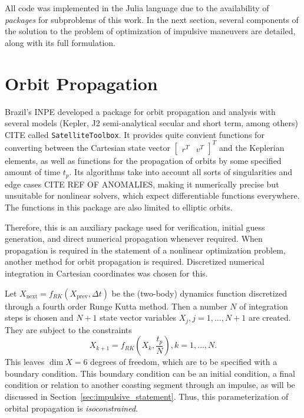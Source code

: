 
All code was implemented in the Julia language due to the availability of \textit{packages} for subproblems of this work. In the next section, several components of the solution to the problem of optimization of impulsive maneuvers are detailed, along with its full formulation.

\section{Orbit Propagation}

Brazil's INPE developed a package for orbit propagation and analysis with several models (Kepler, J2 semi-analytical secular and short term, among others) CITE called \texttt{SatelliteToolbox}. It provides quite convient functions for converting between the Cartesian state vector \(\begin{bmatrix}
    r^T & v^T
\end{bmatrix}^T\) and the Keplerian elements, as well as functions for the propagation of orbits by some specified amount of time \(t_p\). Its algorithms take into account all sorts of singularities and edge cases CITE REF OF ANOMALIES, making it numerically precise but unsuitable for nonlinear solvers, which expect differentiable functions everywhere. The functions in this package are also limited to elliptic orbits.

Therefore, this is an auxiliary package used for verification, initial guess generation, and direct numerical propagation whenever required. When propagation is required in the statement of a nonlinear optimization problem, another method for orbit propagation is required. Discretized numerical integration in Cartesian coordinates was chosen for this. 

Let \(X_{\text{next}} = f_{RK}(X_{\text{prev}}, \Delta t)\) be the (two-body) dynamics function discretized through a fourth order Runge Kutta method. Then a number \(N\) of integration steps is chosen and \(N+1\) state vector variables \(X_j, j=1,\dots,N+1\) are created. They are subject to the constraints
\begin{equation}
    X_{k+1} = f_{RK}(X_k, \frac{t_p}{N}), k = 1, \dots, N.
\end{equation}
This leaves \(\dim X = 6\) degrees of freedom, which are to be specified with a boundary condition. This boundary condition can be an initial condition, a final condition or relation to another coasting segment through an impulse, as will be discussed in Section~\ref{sec:impulsive_statement}. Thus, this parameterization of orbital propagation is \textit{isoconstrained}.

